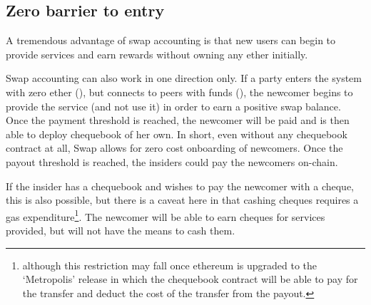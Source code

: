 
\subsection{Zero barrier to entry}

A tremendous advantage of swap accounting is that new users can begin to provide services and earn rewards without owning any ether initially.

Swap accounting can also work in one direction only. If a party enters the system with zero ether (), but connects to peers with funds (), the newcomer begins to provide the service (and not use it) in order to earn a positive swap balance. Once the payment threshold is reached, the newcomer will be paid and is then able to deploy chequebook of her own.
In short, even without any chequebook contract at all, Swap allows for zero cost onboarding of newcomers. Once the payout threshold is reached, the insiders could pay the newcomers on-chain. 

If the insider has a chequebook and wishes to pay the newcomer with a cheque, this is also possible, but there is a caveat here in that cashing cheques requires a gas expenditure\footnote{although this restriction may fall once ethereum is upgraded to the `Metropolis' release in which the chequebook contract will be able to pay for the transfer and deduct the cost of the transfer from the payout.}. The newcomer will be able to earn cheques for services provided, but will not have the means to cash them. 

